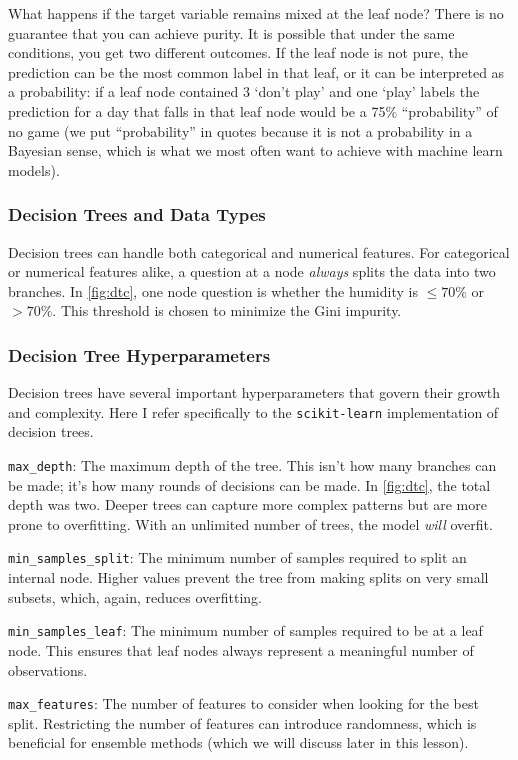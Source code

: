 What happens if the target variable remains mixed at the leaf node? There is no guarantee that you can achieve purity. It is possible that under the same conditions, you get two different outcomes. If the leaf node is not pure, the prediction can be the most common label in that leaf, or it can be interpreted as a probability: if a leaf node contained 3 `don't play' and one `play' labels the prediction for a day that falls in that leaf node would be a 75\% ``probability'' of no game (we put ``probability'' in quotes because it is not a probability in a Bayesian sense, which is what we most often want to achieve with machine learn models).

\subsubsection*{Decision Trees and Data Types}
Decision trees can handle both categorical and numerical features. For categorical or numerical features alike, a question at a node \textit{always} splits the data into two branches. In \autoref{fig:dtc}, one node question is whether the humidity is $\leq70\%$ or $>70\%$. This threshold is chosen to minimize the Gini impurity. 

\subsubsection*{Decision Tree Hyperparameters}
Decision trees have several important hyperparameters that govern their growth and complexity. Here I refer specifically to the \verb|scikit-learn| implementation of decision trees.

\verb|max_depth|: The maximum depth of the tree. This isn't how many branches can be made; it's how many rounds of decisions can be made. In \autoref{fig:dtc}, the total depth was two. Deeper trees can capture more complex patterns but are more prone to overfitting. With an unlimited number of trees, the model \textit{will} overfit.

\verb|min_samples_split|: The minimum number of samples required to split an internal node. Higher values prevent the tree from making splits on very small subsets, which, again, reduces overfitting.

\verb|min_samples_leaf|: The minimum number of samples required to be at a leaf node. This ensures that leaf nodes always represent a meaningful number of observations.

\verb|max_features|: The number of features to consider when looking for the best split. Restricting the number of features can introduce randomness, which is beneficial for ensemble methods (which we will discuss later in this lesson).

